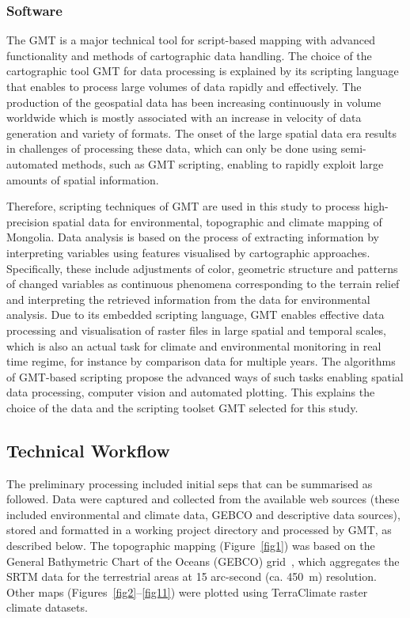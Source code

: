 \documentclass[geosciences,article,accept,pdftex,oneauthor]{Definitions/mdpi}
\begin{document}
\subsubsection{Software}
The GMT is a major technical tool for script-based mapping with advanced functionality and methods of cartographic data handling. The choice of the cartographic tool GMT for data processing is explained by its scripting language that enables to process large volumes of data rapidly and effectively. The production of the geospatial data has been increasing continuously in volume worldwide which is mostly associated with an increase in velocity of data generation and variety of formats. The onset of the large spatial data era results in challenges of processing these data, which can only be done using semi-automated methods, such as GMT scripting, enabling to rapidly exploit large amounts of spatial information. 



Therefore, scripting techniques of GMT are used in this study to process high-precision spatial data for environmental, topographic and climate mapping of Mongolia. Data analysis is based on the process of extracting information by interpreting variables using features visualised by cartographic approaches. Specifically, these include adjustments of color, geometric structure and patterns of changed variables as continuous phenomena corresponding to the terrain relief and interpreting the retrieved information from the data for environmental analysis. Due to its embedded scripting language, GMT enables effective data processing and visualisation of raster files in large spatial and temporal scales, which is also an actual task for climate and environmental monitoring in real time regime, for instance by comparison data for multiple years. The algorithms of GMT-based scripting propose the advanced ways of such tasks enabling spatial data processing, computer vision and automated plotting. This explains the choice of the data and the scripting toolset GMT selected for this study.

\subsection{Technical Workflow}
{The preliminary processing included initial seps that can be summarised as followed. Data were captured and collected from the available web sources (these included environmental and climate data, GEBCO and descriptive data sources), stored and formatted in a working project directory and processed by GMT, as described below.} The topographic mapping (Figure~\ref{fig1}) was based on the General Bathymetric Chart of the Oceans (GEBCO) grid~\cite{Schenke2016}, which aggregates the SRTM data for the terrestrial areas at 15 arc-second (ca. \mbox{450 m}) resolution. Other maps (Figures~\ref{fig2}--\ref{fig11}) were plotted using TerraClimate raster climate datasets. 
\end{document}
